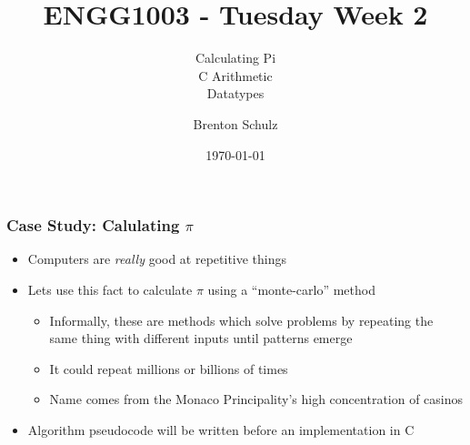 \documentclass[14pt]{beamer}
\title{ENGG1003 - Tuesday Week 2}
\subtitle{Calculating Pi\\C Arithmetic\\Datatypes}
\author{Brenton Schulz}
\institute{University of Newcastle}
\date{\today}
\begin{document}
\titlepage

\begin{frame}
\frametitle{Case Study: Calulating $\pi$}
\begin{itemize}
\item Computers are \textit{really} good at repetitive things
\item Lets use this fact to calculate $\pi$ using a ``monte-carlo'' method
	\begin{itemize}
		\item Informally, these are methods which solve problems by repeating the same thing with different inputs until patterns emerge
		\item It could repeat millions or billions of times
		\item Name comes from the Monaco Principality's high concentration of casinos
	\end{itemize}
\item Algorithm pseudocode will be written before an implementation in C
\end{itemize}
\end{frame}
\end{document}
